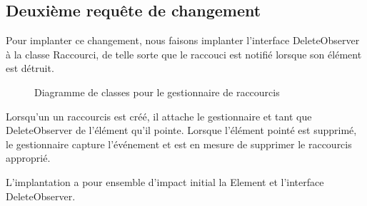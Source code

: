 \documentclass{article}
\begin{document}
  \subsection{Deuxième requête de changement}
  Pour implanter ce changement, nous faisons implanter l'interface
  \textsf{DeleteObserver} à la classe \textsf{Raccourci}, de telle sorte que le
  raccouci est notifié lorsque son élément est détruit.

  \begin{sidewaysfigure}
  \centering
  \resizebox{\textwidth}{!}{}
  \caption{Diagramme de classes pour le gestionnaire de raccourcis}
  \end{sidewaysfigure}

  Lorsqu'un un raccourcis est créé, il attache le gestionnaire et tant que
  DeleteObserver de l'élément qu'il pointe. Lorsque l'élément pointé est
  supprimé, le gestionnaire capture l'événement et est en mesure de supprimer le
  raccourcis approprié.

  L'implantation a pour ensemble d'impact initial la \textsf{Element} et
  l'interface \textsf{DeleteObserver}.
\end{document}
